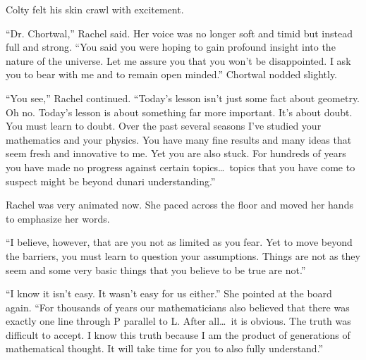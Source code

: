 Colty felt his skin crawl with excitement.


``Dr. Chortwal,'' Rachel said. Her voice was no longer soft and timid but instead full and
strong. ``You said you were hoping to gain profound insight into the nature of the universe.
Let me assure you that you won't be disappointed. I ask you to bear with me and to remain
open minded.'' Chortwal nodded slightly.

``You see,'' Rachel continued. ``Today's lesson isn't just some fact about geometry. Oh no.
Today's lesson is about something far more important. It's about doubt. You must learn to doubt.
Over the past several seasons I've studied your mathematics and your physics. You have many fine
results and many ideas that seem fresh and innovative to me. Yet you are also stuck. For
hundreds of years you have made no progress against certain topics\ldots\ topics that you have
come to suspect might be beyond dunari understanding.''

Rachel was very animated now. She paced across the floor and moved her hands to emphasize her
words.

``I believe, however, that are you not as limited as you fear. Yet to move beyond the
barriers, you must learn to question your assumptions. Things are not as they seem and some very
basic things that you believe to be true are not.''

``I know it isn't easy. It wasn't easy for us either.'' She pointed at the board again. ``For
thousands of years our mathematicians also believed that there was exactly one line through P
parallel to L. After all\ldots\ it is obvious. The truth was difficult to accept. I know this
truth because I am the product of generations of mathematical thought. It will take time for you
to also fully understand.''
